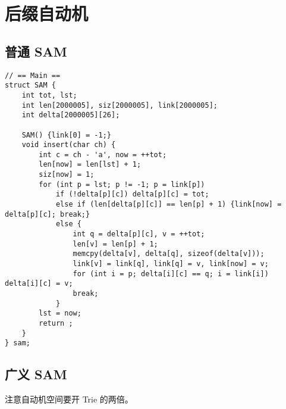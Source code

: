 \section{后缀自动机}

\subsection{普通 SAM}

\begin{verbatim}
// == Main ==
struct SAM {
    int tot, lst;
    int len[2000005], siz[2000005], link[2000005];
    int delta[2000005][26];

    SAM() {link[0] = -1;}
    void insert(char ch) {
        int c = ch - 'a', now = ++tot;
        len[now] = len[lst] + 1;
        siz[now] = 1;
        for (int p = lst; p != -1; p = link[p])
            if (!delta[p][c]) delta[p][c] = tot;
            else if (len[delta[p][c]] == len[p] + 1) {link[now] = delta[p][c]; break;}
            else {
                int q = delta[p][c], v = ++tot;
                len[v] = len[p] + 1;
                memcpy(delta[v], delta[q], sizeof(delta[v]));
                link[v] = link[q], link[q] = v, link[now] = v;
                for (int i = p; delta[i][c] == q; i = link[i]) delta[i][c] = v;
                break;
            }
        lst = now;
        return ;
    }
} sam;
\end{verbatim}

\subsection{广义 SAM}

注意自动机空间要开 Trie 的两倍。

